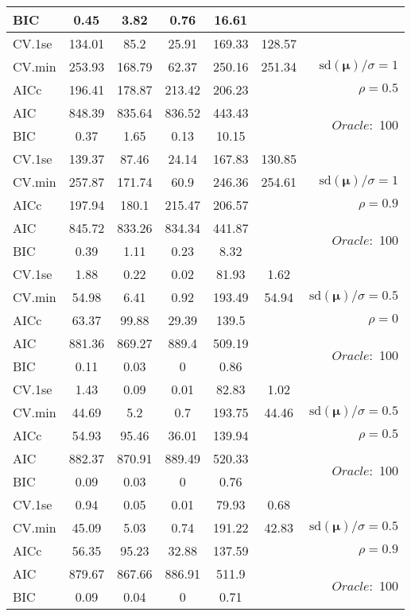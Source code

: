 \begin{table}
\begin{center}
\begin{tabular}{l*{5}{c}|r}
BIC & 0.45 & 3.82 & 0.76 & 16.61 & &  \\
 \hline 
CV.1se & 134.01 & 85.2 & 25.91 & 169.33 & 128.57 & \\
CV.min & 253.93 & 168.79 & 62.37 & 250.16 & 251.34 &  $\mathrm{sd}(\mathbf{\mu})/\sigma=1$ \\
AICc & 196.41 & 178.87 & 213.42 & 206.23 & & $\rho=0.5$ \\
AIC & 848.39 & 835.64 & 836.52 & 443.43 & &  \multirow{2}{*}{$Oracle: $ 100} \\
BIC & 0.37 & 1.65 & 0.13 & 10.15 & &  \\
 \hline 
CV.1se & 139.37 & 87.46 & 24.14 & 167.83 & 130.85 & \\
CV.min & 257.87 & 171.74 & 60.9 & 246.36 & 254.61 &  $\mathrm{sd}(\mathbf{\mu})/\sigma=1$ \\
AICc & 197.94 & 180.1 & 215.47 & 206.57 & & $\rho=0.9$ \\
AIC & 845.72 & 833.26 & 834.34 & 441.87 & &  \multirow{2}{*}{$Oracle: $ 100} \\
BIC & 0.39 & 1.11 & 0.23 & 8.32 & &  \\
 \hline 
CV.1se & 1.88 & 0.22 & 0.02 & 81.93 & 1.62 & \\
CV.min & 54.98 & 6.41 & 0.92 & 193.49 & 54.94 &  $\mathrm{sd}(\mathbf{\mu})/\sigma=0.5$ \\
AICc & 63.37 & 99.88 & 29.39 & 139.5 & & $\rho=0$ \\
AIC & 881.36 & 869.27 & 889.4 & 509.19 & &  \multirow{2}{*}{$Oracle: $ 100} \\
BIC & 0.11 & 0.03 & 0 & 0.86 & &  \\
 \hline 
CV.1se & 1.43 & 0.09 & 0.01 & 82.83 & 1.02 & \\
CV.min & 44.69 & 5.2 & 0.7 & 193.75 & 44.46 &  $\mathrm{sd}(\mathbf{\mu})/\sigma=0.5$ \\
AICc & 54.93 & 95.46 & 36.01 & 139.94 & & $\rho=0.5$ \\
AIC & 882.37 & 870.91 & 889.49 & 520.33 & &  \multirow{2}{*}{$Oracle: $ 100} \\
BIC & 0.09 & 0.03 & 0 & 0.76 & &  \\
 \hline 
CV.1se & 0.94 & 0.05 & 0.01 & 79.93 & 0.68 & \\
CV.min & 45.09 & 5.03 & 0.74 & 191.22 & 42.83 &  $\mathrm{sd}(\mathbf{\mu})/\sigma=0.5$ \\
AICc & 56.35 & 95.23 & 32.88 & 137.59 & & $\rho=0.9$ \\
AIC & 879.67 & 867.66 & 886.91 & 511.9 & &  \multirow{2}{*}{$Oracle: $ 100} \\
BIC & 0.09 & 0.04 & 0 & 0.71 & &  \\
 \hline 
\end{tabular}
\end{center}
\vspace{-1cm}
\end{table}





